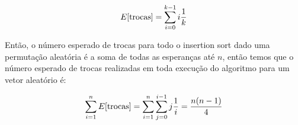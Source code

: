 \documentclass{article}
\begin{document}
\begin{equation}
	\notag
	E[\text{trocas}] = \sum\limits_{i=0}^{k-1} i \dfrac{1}{k}
\end{equation}

Então, o número esperado de trocas para todo o insertion sort dado uma permutação
aleatória é a soma de todas as esperanças até $n$, então temos que o número esperado
de trocas realizadas em toda execução do algoritmo para um vetor aleatório é:

\begin{equation}
\notag
	\sum\limits_{i=1}^{n}E[\text{trocas}] = \sum\limits_{i=1}^{n}\sum\limits_{j=0}^{i-1} j \dfrac{1}{i} =\dfrac{n(n-1)}{4}
\end{equation}
\end{document}

